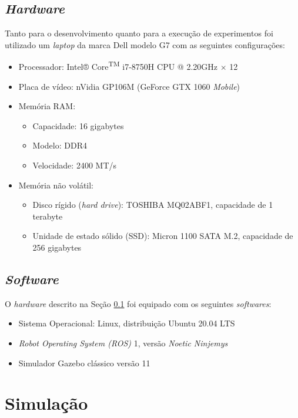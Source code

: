 \subsection{\textit{Hardware}}
\label{sec:env-hardware}
Tanto para o desenvolvimento quanto para a execução de experimentos foi 
utilizado um \textit{laptop} da marca Dell modelo G7 com as seguintes 
configurações:
\begin{itemize}
  \item Processador: Intel® Core\textsuperscript{TM} i7-8750H CPU @ 2.20GHz $\times$ 12
  \item Placa de vídeo: nVidia GP106M (GeForce GTX 1060 \textit{Mobile})
  \item Memória RAM: \begin{itemize}
    \item Capacidade: 16 gigabytes
    \item Modelo: DDR4
    \item Velocidade: 2400 MT/s
  \end{itemize}
  \item Memória não volátil: \begin{itemize}
    \item Disco rígido (\textit{hard drive}): TOSHIBA MQ02ABF1, capacidade de 1 terabyte
    \item Unidade de estado sólido (SSD): Micron 1100 SATA M.2, capacidade de 256 gigabytes
  \end{itemize}
\end{itemize}

\subsection{\textit{Software}}
\label{sec:env-software}
O \textit{hardware} descrito na Seção \ref{sec:env-hardware} foi equipado 
com os seguintes \textit{softwares}:
\begin{itemize}
  \item Sistema Operacional: Linux, distribuição Ubuntu 20.04 LTS
  \item \textit{Robot Operating System (ROS)} 1, versão \textit{Noetic Ninjemys}
  \item Simulador Gazebo clássico versão 11
\end{itemize}

\section{Simulação}
